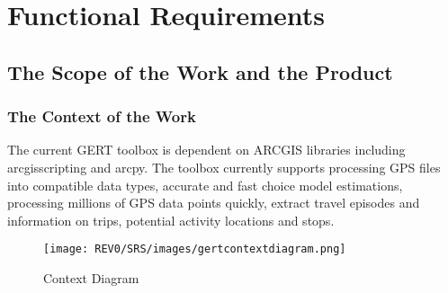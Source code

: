 \documentclass[12pt, titlepage]{article}
\begin{document}
\newpage
\section{Functional Requirements}

\subsection{The Scope of the Work and the Product}

\subsubsection{The Context of the Work}
The current GERT toolbox is dependent on ARCGIS libraries including arcgisscripting and arcpy. The toolbox currently supports processing GPS files into compatible data types, accurate and fast choice model estimations,  processing millions of GPS data points quickly, extract travel episodes and information on trips, potential activity locations and stops.

\begin{figure}[!h]
	    \begin{center}
    	    \texttt{[image: REV0/SRS/images/gertcontextdiagram.png]}
    	    \caption{Context Diagram}
    	    \label{fig: Context Diagram}
    	\end{center}
\end{figure}
\end{document}

